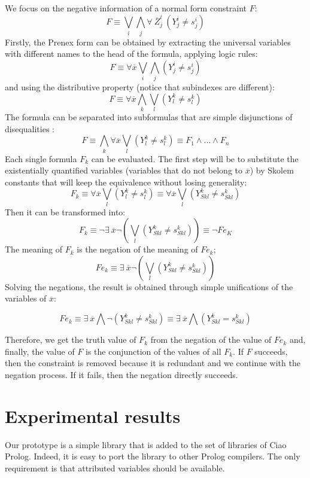 \documentclass{llncs}
\begin{document}
We focus on the negative information of a normal form constraint $F$:
\[ F \equiv  \bigvee_i\bigwedge_j \forall~ \overline{Z}_j^i~(Y_j^i \neq s_j^i) \]
Firstly, the Prenex form \cite{Shoenfield} can be obtained by
extracting the universal variables with different names to the head of
the formula, applying logic rules:
\[ F \equiv \forall \overline{x} \bigvee_i\bigwedge_j (Y_j^i \neq s_j^i) \]
\noindent
and using the distributive property (notice that subindexes are different):
\[ F \equiv \forall \overline{x} \bigwedge_k\bigvee_l (Y_l^k \neq s_l^k) \]
The formula can be separated into subformulas that are simple
disjunctions of disequalities :
\[ F \equiv \bigwedge_k \forall \overline{x} \bigvee_l (Y_l^k \neq s_l^k) \equiv F_1 \wedge ... \wedge F_n\]
Each single formula $F_k$ can be evaluated. The first step will be to
substitute the existentially quantified variables (variables that do not
belong to $\overline{x}$) by Skolem constants that will keep
the equivalence without losing generality:
\[ F_k \equiv \forall \overline{x} \bigvee_l ( Y_l^k \neq s_l^k ) \equiv \forall \overline{x} \bigvee_l ( Y_{Sk l}^k \neq s_{Sk l}^k )  \]
Then it can be transformed into:
\[ F_k \equiv  \neg \exists ~ \overline{x} \neg ( \bigvee_l (Y_{Sk l}^k \neq s_{Sk l}^k) ) \equiv \neg Fe_K \]
The meaning of $F_k$ is the negation of the meaning of $Fe_k$;
\[ Fe_k \equiv \exists ~ \overline{x} \neg ( \bigvee_l (Y_{Sk l}^k \neq s_{Sk l}^k)) \] 
Solving the negations, the result is obtained through simple unifications of the variables of $\overline{x}$:

\[ Fe_k  \equiv \exists ~ \overline{x} \bigwedge \neg (Y_{Sk l}^k \neq s_{Sk l}^k)  \equiv \exists ~ \overline{x} \bigwedge (Y_{Sk l}^k = s_{Sk l}^k)  \]

        Therefore, we get the truth value of $F_k$ from the
        negation of the value of $Fe_k$ and, finally, the value of $F$ is
        the conjunction of the values of all $F_k$. If $F$
        succeeds, then the constraint is removed because it is redundant
        and we continue with the negation process. If it fails, then
        the negation directly succeeds.


\section{Experimental results}
\label{results}

Our prototype is a simple library that is added to the set of
libraries of Ciao Prolog. Indeed, it is easy to port the library to
other Prolog compilers. The only requirement is that attributed
variables should be available.
\end{document}
